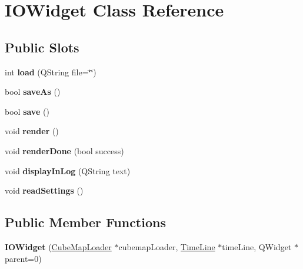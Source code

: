 \hypertarget{class_i_o_widget}{
\section{\-I\-O\-Widget \-Class \-Reference}
\label{class_i_o_widget}
}
\subsection*{\-Public \-Slots}
\begin{DoxyCompactItemize}
\item 
\hypertarget{class_i_o_widget_ac9b2ac0351f32fc5f51299630984da9c}{
int {\bfseries load} (\-Q\-String file=\char`\"{}\char`\"{})}
\label{class_i_o_widget_ac9b2ac0351f32fc5f51299630984da9c}

\item 
\hypertarget{class_i_o_widget_a4db995c7ea1d258f1b7ee2f0b53bb108}{
bool {\bfseries save\-As} ()}
\label{class_i_o_widget_a4db995c7ea1d258f1b7ee2f0b53bb108}

\item 
\hypertarget{class_i_o_widget_ae4c80c1aab683f675de47633e2cca1e3}{
bool {\bfseries save} ()}
\label{class_i_o_widget_ae4c80c1aab683f675de47633e2cca1e3}

\item 
\hypertarget{class_i_o_widget_ab918e445f3e532e840fb4cbe6787e35e}{
void {\bfseries render} ()}
\label{class_i_o_widget_ab918e445f3e532e840fb4cbe6787e35e}

\item 
\hypertarget{class_i_o_widget_ac60042929ce866e684d8716dac749ace}{
void {\bfseries render\-Done} (bool success)}
\label{class_i_o_widget_ac60042929ce866e684d8716dac749ace}

\item 
\hypertarget{class_i_o_widget_acd9c86a84b4bf8bc4215aad0caaf85ec}{
void {\bfseries display\-In\-Log} (\-Q\-String text)}
\label{class_i_o_widget_acd9c86a84b4bf8bc4215aad0caaf85ec}

\item 
\hypertarget{class_i_o_widget_a86fd950fb38f824913cb44556cc6b755}{
void {\bfseries read\-Settings} ()}
\label{class_i_o_widget_a86fd950fb38f824913cb44556cc6b755}

\end{DoxyCompactItemize}
\subsection*{\-Public \-Member \-Functions}
\begin{DoxyCompactItemize}
\item 
\hypertarget{class_i_o_widget_afc126a19a12e9a26d69fc6839c6f2eb8}{
{\bfseries \-I\-O\-Widget} (\hyperlink{class_cube_map_loader}{\-Cube\-Map\-Loader} $\ast$cubemap\-Loader, \hyperlink{class_time_line}{\-Time\-Line} $\ast$time\-Line, \-Q\-Widget $\ast$parent=0)}
\label{class_i_o_widget_afc126a19a12e9a26d69fc6839c6f2eb8}

\end{DoxyCompactItemize}
